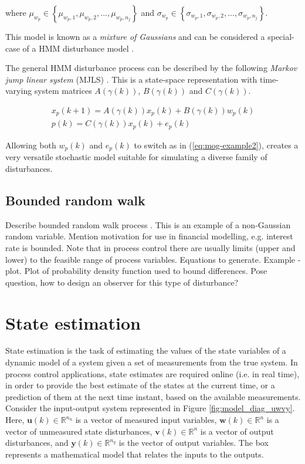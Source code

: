 where $\mu_{w_p}\in\left\{\mu_{w_p,1},\mu_{w_p,2},...,\mu_{w_p,n_j}\right\}$ and $\sigma_{w_p}\in\left\{\sigma_{w_p,1},\sigma_{w_p,2},...,\sigma_{w_p,n_j}\right\}$.

This model is known as a \textit{mixture of Gaussians} and can be considered a special-case of a HMM disturbance model \citep{wong_disturbance_2007}.

The general HMM disturbance process can be described by the following \textit{Markov jump linear system} (MJLS) \citep{costa_discrete-time_2005}. This is a state-space representation with time-varying system matrices $A(\gamma(k))$, $B(\gamma(k))$ and $C(\gamma(k))$.

\begin{equation} \label{eq:HMM}
	\begin{split}
	x_p(k+1)= A(\gamma(k))x_p(k)+B(\gamma(k))w_p(k) \\
	p(k)=C(\gamma(k))x_p(k) + e_p(k)
	\end{split}
\end{equation}

Allowing both $w_p(k)$ and $e_p(k)$ to switch as in (\ref{eq:mog-example2}), creates a very versatile stochastic model suitable for simulating a diverse family of disturbances.

\subsection{Bounded random walk}

\begin{outline}
	\1 Describe bounded random walk process \citep{nicolau_stationary_2002}.
	\1 This is an example of a non-Gaussian random variable.
	\1 Mention motivation for use in financial modelling, e.g. interest rate is bounded.
	\1 Note that in process control there are usually limits (upper and lower) to the feasible range of process variables.
	\1 Equations to generate.
	\1 Example - plot.
	\1 Plot of probability density function used to bound differences.
	\1 Pose question, how to design an observer for this type of disturbance? 
\end{outline}

\section{State estimation}

State estimation is the task of estimating the values of the state variables of a dynamic model of a system given a set of measurements from the true system. In process control applications, state estimates are required online (i.e. in real time), in order to provide the best estimate of the states at the current time, or a prediction of them at the next time instant, based on the available measurements. Consider the input-output system represented in Figure \ref{fig:model_diag_uwvy}. Here, $\mathbf{u}(k) \in \mathbb{R}^{n_u}$ is a vector of measured input variables, $\mathbf{w}(k) \in \mathbb{R}^n$ is a vector of unmeasured state disturbances, $\mathbf{v}(k) \in \mathbb{R}^n$ is a vector of output disturbances, and $\mathbf{y}(k) \in \mathbb{R}^{n_y}$ is the vector of output variables. The box represents a mathematical model that relates the inputs to the outputs.

